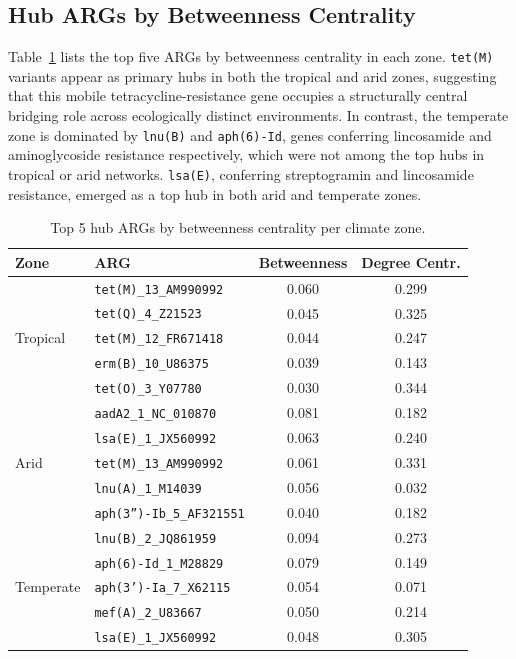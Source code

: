 \documentclass[12pt,a4paper]{article}
\begin{document}
\subsection{Hub ARGs by Betweenness Centrality}\label{sec:res-hubs}

Table~\ref{tab:hubs} lists the top five ARGs by betweenness centrality
in each zone.
\texttt{tet(M)} variants appear as primary hubs in both the tropical
and arid zones, suggesting that this mobile tetracycline-resistance
gene occupies a structurally central bridging role across ecologically
distinct environments.
In contrast, the temperate zone is dominated by \texttt{lnu(B)} and
\texttt{aph(6)-Id}, genes conferring lincosamide and aminoglycoside
resistance respectively, which were not among the top hubs in tropical
or arid networks.
\texttt{lsa(E)}, conferring streptogramin and lincosamide resistance,
emerged as a top hub in both arid and temperate zones.

\begin{table}[htbp]
  \centering
  \caption{Top 5 hub ARGs by betweenness centrality per climate zone.}
  \label{tab:hubs}
  \begin{tabular}{llcc}
    \toprule
    Zone      & ARG                      & Betweenness & Degree Centr. \\
    \midrule
    \multirow{5}{*}{Tropical}
      & \texttt{tet(M)\_13\_AM990992} & 0.060 & 0.299 \\
      & \texttt{tet(Q)\_4\_Z21523}    & 0.045 & 0.325 \\
      & \texttt{tet(M)\_12\_FR671418} & 0.044 & 0.247 \\
      & \texttt{erm(B)\_10\_U86375}   & 0.039 & 0.143 \\
      & \texttt{tet(O)\_3\_Y07780}    & 0.030 & 0.344 \\
    \midrule
    \multirow{5}{*}{Arid}
      & \texttt{aadA2\_1\_NC\_010870}     & 0.081 & 0.182 \\
      & \texttt{lsa(E)\_1\_JX560992}      & 0.063 & 0.240 \\
      & \texttt{tet(M)\_13\_AM990992}     & 0.061 & 0.331 \\
      & \texttt{lnu(A)\_1\_M14039}        & 0.056 & 0.032 \\
      & \texttt{aph(3'')-Ib\_5\_AF321551} & 0.040 & 0.182 \\
    \midrule
    \multirow{5}{*}{Temperate}
      & \texttt{lnu(B)\_2\_JQ861959}   & 0.094 & 0.273 \\
      & \texttt{aph(6)-Id\_1\_M28829}  & 0.079 & 0.149 \\
      & \texttt{aph(3')-Ia\_7\_X62115} & 0.054 & 0.071 \\
      & \texttt{mef(A)\_2\_U83667}     & 0.050 & 0.214 \\
      & \texttt{lsa(E)\_1\_JX560992}   & 0.048 & 0.305 \\
    \bottomrule
  \end{tabular}
\end{table}
\end{document}

